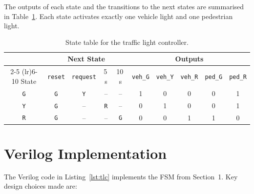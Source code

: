 \documentclass[10pt,a4paper]{article}
\theoremstyle{definition} %
\begin{document}
The outputs of each state and the transitions to the next states are summarised in Table~\ref{tab:state-table}. Each state activates exactly one vehicle light and one pedestrian light.

\begin{table}[htbp]
    \centering
    \caption{State table for the traffic light controller.}
    \label{tab:state-table}
    \begin{tabular}{c cccc ccccc}
        \toprule
                   & \multicolumn{4}{c}{Next State} & \multicolumn{5}{c}{Outputs}                                                                                                                     \\
        \cmidrule(lr){2-5} \cmidrule(lr){6-10}
        State      & \texttt{reset}                 & \texttt{request}            & 5\,s       & 10\,s      & \texttt{veh\_G} & \texttt{veh\_Y} & \texttt{veh\_R} & \texttt{ped\_G} & \texttt{ped\_R} \\
        \midrule
        \texttt{G} & \texttt{G}                     & \texttt{Y}                  & --         & --         & 1               & 0               & 0               & 0               & 1               \\
        \texttt{Y} & \texttt{G}                     & --                          & \texttt{R} & --         & 0               & 1               & 0               & 0               & 1               \\
        \texttt{R} & \texttt{G}                     & --                          & --         & \texttt{G} & 0               & 0               & 1               & 1               & 0               \\
        \bottomrule
    \end{tabular}
\end{table}

\newpage

\section{Verilog Implementation}



The Verilog code in Listing~\ref{lst:tlc} implements the FSM from Section~1. Key design choices made are:
\end{document}
